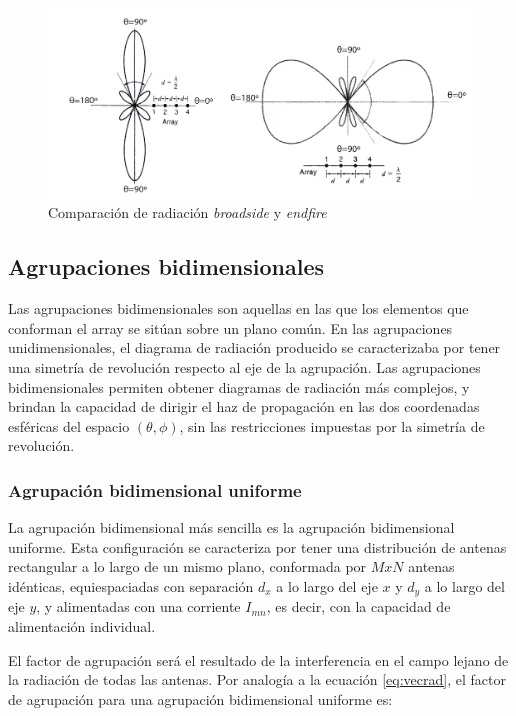 \begin{figure}[h]
    \centering
        \includegraphics[width=\textwidth]{archivos/array/side}
        \caption{Comparación de radiación \textit{broadside} y \textit{endfire}}
        \label{fig:side}
\end{figure}

\subsection{Agrupaciones bidimensionales}
\par Las agrupaciones bidimensionales son aquellas en las que los elementos que conforman el array se sitúan sobre un plano común. En las agrupaciones unidimensionales, el diagrama de radiación producido se caracterizaba por tener una simetría de revolución respecto al eje de la agrupación. Las agrupaciones bidimensionales permiten obtener diagramas de radiación más complejos, y brindan la capacidad de dirigir el haz de propagación en las dos coordenadas esféricas del espacio $(\theta, \phi)$, sin las restricciones impuestas por la simetría de revolución. \cite{Cardama2002}
\\
\subsubsection{Agrupación bidimensional uniforme}
\par La agrupación bidimensional más sencilla es la agrupación bidimensional uniforme. Esta configuración se caracteriza por tener una distribución de antenas rectangular a lo largo de un mismo plano, conformada por $MxN$ antenas idénticas, equiespaciadas con separación $d_{x}$ a lo largo del eje $x$ y $d_{y}$ a lo largo del eje $y$, y alimentadas con una corriente $I_{mn}$, es decir, con la capacidad de alimentación individual. \cite{Cardama2002}
\\
\par El factor de agrupación será el resultado de la interferencia en el campo lejano de la radiación de todas las antenas. Por analogía a la ecuación \ref{eq:vecrad}, el factor de agrupación para una agrupación bidimensional uniforme es: \cite{Cardama2002}

